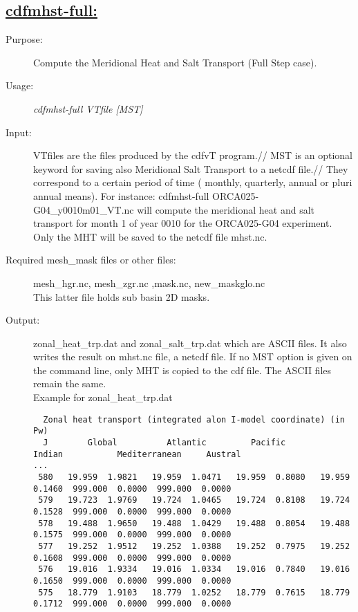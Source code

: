 \documentclass[a4paper,11pt]{article}
\begin{document}
\subsection*{\underline{cdfmhst-full:}}
\begin{description}
\item[Purpose:] Compute the Meridional Heat and Salt Transport (Full Step case).
\item[Usage:] {\em cdfmhst-full VTfile [MST] }
\item[Input:] VTfiles are the files produced by the cdfvT program.//
MST is an optional keyword for saving also Meridional Salt Transport to a netcdf file.//
They correspond to a certain period of time ( monthly, quarterly, annual or
pluri annual means). 
For instance: cdfmhst-full ORCA025-G04\_y0010m01\_VT.nc
will compute the meridional heat and salt transport for month 1 of year 0010 for the ORCA025-G04 experiment. Only the MHT
will be saved to the netcdf file mhst.nc.
\item[Required mesh\_mask files or other files:]   mesh\_hgr.nc, mesh\_zgr.nc ,mask.nc, new\_maskglo.nc \\
This latter file holds sub basin 2D  masks.
\item[Output:] zonal\_heat\_trp.dat and zonal\_salt\_trp.dat which are ASCII files. It also writes the result on mhst.nc
      file, a netcdf file. If no MST option is given on the command line, only MHT is copied to the cdf file. The ASCII files
      remain the same. 
\\Example for zonal\_heat\_trp.dat
\begin{scriptsize}
\begin{verbatim}
  Zonal heat transport (integrated alon I-model coordinate) (in Pw)
  J        Global          Atlantic         Pacific          Indian           Mediterranean     Austral
...
 580   19.959  1.9821   19.959  1.0471   19.959  0.8080   19.959  0.1460  999.000  0.0000  999.000  0.0000
 579   19.723  1.9769   19.724  1.0465   19.724  0.8108   19.724  0.1528  999.000  0.0000  999.000  0.0000
 578   19.488  1.9650   19.488  1.0429   19.488  0.8054   19.488  0.1575  999.000  0.0000  999.000  0.0000
 577   19.252  1.9512   19.252  1.0388   19.252  0.7975   19.252  0.1608  999.000  0.0000  999.000  0.0000
 576   19.016  1.9334   19.016  1.0334   19.016  0.7840   19.016  0.1650  999.000  0.0000  999.000  0.0000
 575   18.779  1.9103   18.779  1.0252   18.779  0.7615   18.779  0.1712  999.000  0.0000  999.000  0.0000

\end{verbatim}
\end{scriptsize}
\end{description}
\end{document}
